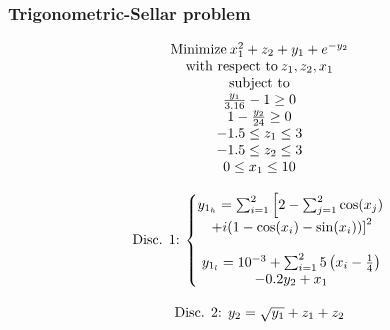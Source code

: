 \documentclass[conf]{new-aiaa}
\begin{document}
\subsubsection{Trigonometric-Sellar problem}
\begin{equation}
    \begin{matrix}
    \textnormal{Minimize} \: x_1^2+z_2+y_1+e^{-y_2} \\
    \textnormal{with respect to} \: z_1,z_2,x_1 \\
    \textnormal{subject to}  \\
    \frac{y_1}{3.16}-1\geq 0  \\
    1-\frac{y_2}{24}\geq 0 \\
    -1.5\leq z_1 \leq 3 \\
    -1.5\leq z_2 \leq 3 \\
    0\leq x_1 \leq 10 \\
    \\
    \textnormal{Disc. 1:} \: \left\{\begin{matrix} 
     y_{1_h}=\sum_{i=1}^{2}\left[2-\sum_{j=1}^{2}\cos(x_j) \right. \\ \left. +i(1-\cos(x_i)-\sin(x_i))\right]^2 \\
    \\
    y_{1_l}=10^{-3}+\sum_{i=1}^{2} 5\left(x_i-\frac{1}{4}\right)\\-0.2y_2+x_1
    \end{matrix} \right. \\
    \\
    \textnormal{Disc. 2:} \:\: y_2=\sqrt{y_1}+z_1+z_2\\
    \end{matrix}
\end{equation}
\end{document}
